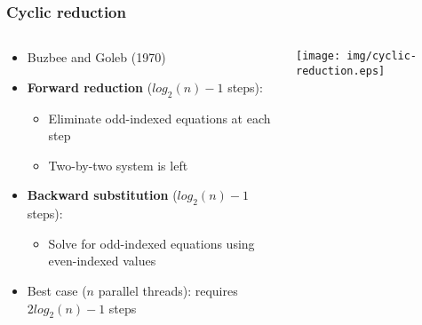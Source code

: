 \begin{frame}
\frametitle{Cyclic reduction}
\begin{columns}
\begin{column}{0.5\textwidth}
\begin{itemize}
\item Buzbee and Goleb (1970)
\item \textbf{Forward reduction} ($log_2(n)-1$ steps):
    \begin{itemize}
    \item Eliminate odd-indexed equations at each step
    \item Two-by-two system is left
    \end{itemize}
\item \textbf{Backward substitution} ($log_2(n)-1$ steps):
    \begin{itemize}
    \item Solve for odd-indexed equations using even-indexed values
    \end{itemize}
\item Best case ($n$ parallel threads): requires $2log_2(n)-1$ steps
\end{itemize}
\end{column}
\begin{column}{0.5\textwidth}
\texttt{[image: img/cyclic-reduction.eps]}
\end{column}
\end{columns}
\end{frame}

